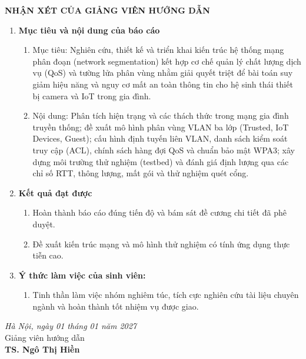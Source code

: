 \newpage
{}
\thisfancypage{
	\setlength{\fboxsep}{0.5cm}
	\fbox}{}
 
\fontsize{13pt}{16pt}\selectfont
\bigbreak
\begin{center}
	{\bf NHẬN XÉT CỦA GIẢNG VIÊN HƯỚNG DẪN}
\end{center}

\fontsize{12pt}{14pt}\selectfont
\begin{enumerate}
 \item [{\bf 1.}]{\bf Mục tiêu và nội dung của báo cáo}
 \begin{enumerate}
 \item Mục tiêu: Nghiên cứu, thiết kế và triển khai kiến trúc hệ thống mạng phân đoạn (network segmentation) kết hợp cơ chế quản lý chất lượng dịch vụ (QoS) và tường lửa phân vùng nhằm giải quyết triệt để bài toán suy giảm hiệu năng và nguy cơ mất an toàn thông tin cho hệ sinh thái thiết bị camera và IoT trong gia đình.
 \item Nội dung: Phân tích hiện trạng và các thách thức trong mạng gia đình truyền thống; đề xuất mô hình phân vùng VLAN ba lớp (Trusted, IoT Devices, Guest); cấu hình định tuyến liên VLAN, danh sách kiểm soát truy cập (ACL), chính sách hàng đợi QoS và chuẩn bảo mật WPA3; xây dựng môi trường thử nghiệm (testbed) và đánh giá định lượng qua các chỉ số RTT, thông lượng, mất gói và thử nghiệm quét cổng.
 \end{enumerate}
    
\item [{\bf 2.}] {\bf Kết quả đạt được} 
 \begin{enumerate}
\item Hoàn thành báo cáo đúng tiến độ và bám sát đề cương chi tiết đã phê duyệt.
\item Đề xuất kiến trúc mạng và mô hình thử nghiệm có tính ứng dụng thực tiễn cao.
\end{enumerate}
\item [{\bf 3.}]{\bf Ý thức làm việc của sinh viên:}
\begin{enumerate}
\item Tinh thần làm việc nhóm nghiêm túc, tích cực nghiên cứu tài liệu chuyên ngành và hoàn thành tốt nhiệm vụ được giao.
\end{enumerate}
\end{enumerate}

\vspace{5mm}
\hspace{0.5\textwidth}
\begin{minipage}{0.5\textwidth}
\noindent\begin{center}
\textit{Hà Nội, ngày 01 tháng 01  năm 2027} \\
Giảng viên hướng dẫn\\ \vspace{0.6cm}
\vspace{1.5cm}
\textbf{TS. Ngô Thị Hiền}
\end{center}	
\end{minipage}
\restoregeometry
